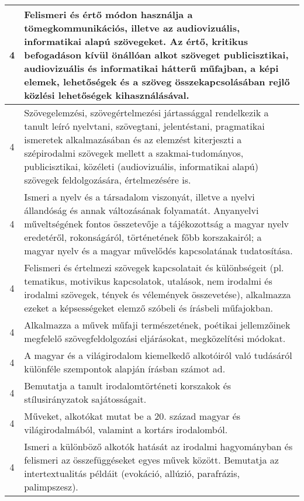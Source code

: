 \begin{longtable}{c | p{} }
                                
                                          4 &  Felismeri és értő módon használja a tömegkommunikációs, illetve az audiovizuális, informatikai alapú szövegeket. Az értő, kritikus befogadáson kívül önállóan alkot szöveget  publicisztikai, audiovizuális és informatikai hátterű műfajban, a képi elemek, lehetőségek és a szöveg összekapcsolásában rejlő közlési lehetőségek kihasználásával. \\ \hline
                                          4 &  Szövegelemzési, szövegértelmezési jártassággal rendelkezik a tanult leíró nyelvtani, szövegtani, jelentéstani, pragmatikai ismeretek alkalmazásában és az elemzést kiterjeszti a szépirodalmi szövegek mellett a szakmai-tudományos, publicisztikai, közéleti (audiovizuális, informatikai alapú) szövegek feldolgozására, értelmezésére is. \\ \hline
                                          4 &  Ismeri a nyelv és a társadalom viszonyát, illetve a nyelvi állandóság és annak változásának folyamatát. Anyanyelvi műveltségének fontos összetevője a tájékozottság a magyar nyelv eredetéről, rokonságáról, történetének főbb korszakairól; a magyar nyelv és a magyar művelődés kapcsolatának tudatosítása. \\ \hline
                                          4 &  Felismeri és értelmezi szövegek kapcsolatait és különbségeit (pl. tematikus, motivikus kapcsolatok, utalások, nem irodalmi és irodalmi szövegek, tények és vélemények összevetése), alkalmazza ezeket a képsességeket elemző szóbeli és írásbeli műfajokban. \\ \hline
                                          4 &  Alkalmazza a művek műfaji természetének, poétikai jellemzőinek megfelelő szövegfeldolgozási eljárásokat, megközelítési módokat. \\ \hline
                                          4 &  A magyar és a világirodalom kiemelkedő alkotóiról való tudásáról különféle szempontok alapján írásban számot ad.
 \\ \hline
                                          4 &  Bemutatja a tanult irodalomtörténeti korszakok és stílusirányzatok sajátosságait. \\ \hline
                                          4 &  Műveket, alkotókat mutat be a 20. század magyar és világirodalmából, valamint a kortárs irodalomból. \\ \hline
                                          4 &  Ismeri a különböző alkotók hatását az irodalmi hagyományban és felismeri az összefüggéseket egyes művek között. Bemutatja az intertextualitás példáit (evokáció, allúzió, parafrázis, palimpszesz). \\ \hline

\end{longtable}

